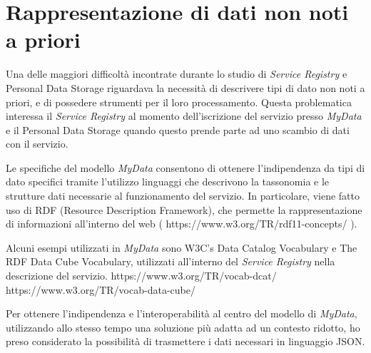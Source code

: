 \section{Rappresentazione di dati non noti a priori}
Una delle maggiori difficolt\`a incontrate durante lo studio di \textit{Service Registry} e Personal Data Storage riguardava la necessit\`a di descrivere tipi di dato non noti a priori, e di possedere strumenti per il loro processamento. Questa problematica interessa il \textit{Service Registry} al momento dell’iscrizione del servizio presso \textit{MyData} e il Personal Data Storage quando questo prende parte ad uno scambio di dati con il servizio.

Le specifiche del modello \textit{MyData} consentono di ottenere l’indipendenza da tipi di dato specifici tramite l’utilizzo linguaggi che descrivono la tassonomia e le strutture dati necessarie al funzionamento del servizio. In particolare, viene fatto uso di RDF (Resource Description Framework), che permette la rappresentazione di informazioni all’interno del web ( https://www.w3.org/TR/rdf11-concepts/ ).

Alcuni esempi utilizzati in \textit{MyData} sono W3C’s Data Catalog Vocabulary e The RDF Data Cube Vocabulary, utilizzati all’interno del \textit{Service Registry} nella descrizione del servizio. https://www.w3.org/TR/vocab-dcat/ https://www.w3.org/TR/vocab-data-cube/

Per ottenere l’indipendenza e l’interoperabilit\`a al centro del modello di \textit{MyData}, utilizzando allo stesso tempo una soluzione pi\`u adatta ad un contesto ridotto, ho preso considerato la possibilit\`a di trasmettere i dati necessari in linguaggio JSON.



